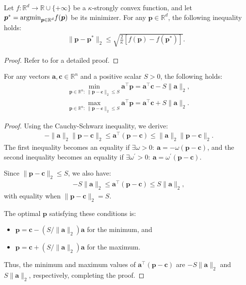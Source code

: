 \begin{lemma}\label{lem:strong-convexity-sphere}
Let $f: \mathbb{R}^d\to\mathbb{R}\cup\{+\infty\}$ be a $\kappa$-strongly convex function, and let $\bm p^* = {\rm argmin}_{\bm p\in\mathbb{R}^d} f(\bm p)$ be its minimizer. For any $\bm p\in\mathbb{R}^d$, the following inequality holds:
\begin{align*}
\| \bm p - \bm p^* \|_2 \leq \sqrt{\frac{2}{\kappa}[f(\bm p) - f(\bm p^*)]}.
\end{align*}
\end{lemma}

\begin{proof}
Refer to \citep{ndiaye2015gap} for a detailed proof.
\end{proof}

\begin{lemma} \label{lem:optimize-linear}
For any vectors $\bm a, \bm c\in\mathbb{R}^n$ and a positive scalar $S > 0$, the following holds:
\begin{align*}
& \min_{\bm p\in\mathbb{R}^n:~\|\bm p - \bm c\|_2\leq S} \bm a^\top \bm p = \bm a^\top \bm c - S\|\bm a\|_2, \\
& \max_{\bm p\in\mathbb{R}^n:~\|\bm p - \bm c\|_2\leq S} \bm a^\top \bm p = \bm a^\top \bm c + S\|\bm a\|_2.
\end{align*}
\end{lemma}

\begin{proof}
Using the Cauchy-Schwarz inequality, we derive:
\begin{align*}
& -\|\bm a\|_2 \|\bm p - \bm c\|_2 \leq \bm a^\top (\bm p - \bm c) \leq \|\bm a\|_2 \|\bm p - \bm c\|_2.
\end{align*}
The first inequality becomes an equality if $\exists\omega>0:~\bm a = -\omega(\bm p - \bm c)$, and the second inequality becomes an equality if $\exists\omega^\prime>0:~\bm a = \omega^\prime(\bm p - \bm c)$. 

Since $\|\bm p - \bm c\|_2\leq S$, we also have:
\begin{align*}
& - S \|\bm a\|_2 \leq \bm a^\top (\bm p - \bm c) \leq S \|\bm a\|_2,
\end{align*}
with equality when $\|\bm p - \bm c\|_2 = S$.

The optimal $\bm p$ satisfying these conditions is:
\begin{itemize}
\item $\bm p = \bm c - (S/\|\bm a\|_2)\bm a$ for the minimum, and
\item $\bm p = \bm c + (S/\|\bm a\|_2)\bm a$ for the maximum.
\end{itemize}
Thus, the minimum and maximum values of $\bm a^\top (\bm p - \bm c)$ are $- S \|\bm a\|_2$ and $S \|\bm a\|_2$, respectively, completing the proof.
\end{proof}
